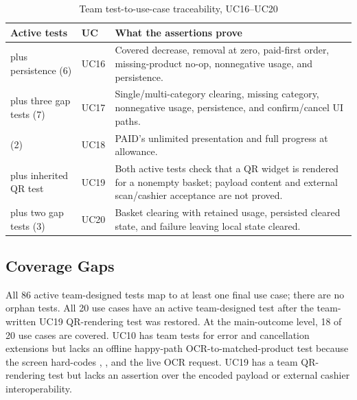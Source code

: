 \documentclass[sigconf]{acmart}
\begin{document}
\begin{table}[t]
  \caption{Team test-to-use-case traceability, UC16--UC20}
  \label{tab:trace-4}
  \centering
  \small
  \begin{tabular}{L{0.29\textwidth}L{0.08\textwidth}L{0.53\textwidth}}
    \toprule
    Active tests & UC & What the assertions prove \\
    \midrule
     plus persistence (6) & UC16 & Covered decrease, removal at zero, paid-first order, missing-product no-op, nonnegative usage, and persistence. \\
     plus three gap tests (7) & UC17 & Single/multi-category clearing, missing category, nonnegative usage, persistence, and confirm/cancel UI paths. \\
     (2) & UC18 & PAID's unlimited presentation and full progress at allowance. \\
     plus inherited QR test & UC19 & Both active tests check that a QR widget is rendered for a nonempty basket; payload content and external scan/cashier acceptance are not proved. \\
     plus two gap tests (3) & UC20 & Basket clearing with retained usage, persisted cleared state, and failure leaving local state cleared. \\
    \bottomrule
  \end{tabular}
\end{table}
\FloatBarrier

\subsection{Coverage Gaps}

All 86 active team-designed tests map to at least one final use case; there are
no orphan tests. All 20 use cases have an active team-designed test after the
team-written UC19 QR-rendering test was restored. At the main-outcome level,
18 of 20 use cases are covered. UC10 has team tests for error and cancellation extensions
but lacks an offline happy-path OCR-to-matched-product test because the screen
hard-codes , , and the live OCR request.
UC19 has a team QR-rendering test but lacks an assertion over the encoded
payload or external cashier interoperability.
\end{document}
